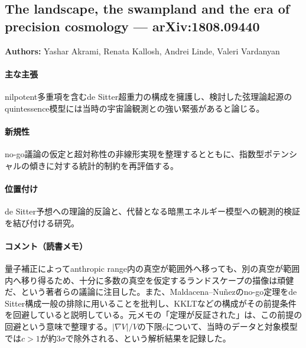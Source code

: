 \subsection{The landscape, the swampland and the era of precision cosmology --- arXiv:1808.09440}

\textbf{Authors:} Yashar Akrami, Renata Kallosh, Andrei Linde, Valeri Vardanyan

\paragraph{主な主張}
nilpotent多重項を含むde Sitter超重力の構成を擁護し、検討した弦理論起源のquintessence模型には当時の宇宙論観測との強い緊張があると論じる\cite{Akrami:2018ylq}。

\paragraph{新規性}
no-go議論の仮定と超対称性の非線形実現を整理するとともに、指数型ポテンシャルの傾きに対する統計的制約を再評価する。

\paragraph{位置付け}
de Sitter予想への理論的反論と、代替となる暗黒エネルギー模型への観測的検証を結び付ける研究。

\paragraph{コメント（読書メモ）}
量子補正によってanthropic range内の真空が範囲外へ移っても、別の真空が範囲内へ移り得るため、十分に多数の真空を仮定するランドスケープの描像は頑健だ、という著者らの議論に注目した。また、Maldacena--Nu\~nezのno-go定理\cite{Maldacena:2000mw}をde Sitter構成一般の排除に用いることを批判し、KKLTなどの構成がその前提条件を回避していると説明している。元メモの「定理が反証された」は、この前提の回避という意味で整理する。$|\nabla V|/V$の下限$c$について、当時のデータと対象模型では$c>1$が約$3\sigma$で除外される、という解析結果を記録した。
